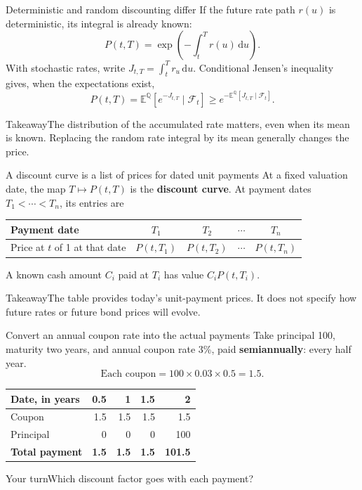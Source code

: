 \documentclass[handout,10pt,t,aspectratio=169]{beamer}
\newenvironment{pausebox}{\begin{block}{Your turn}}{\end{block}}
\newenvironment{keybox}{\begin{exampleblock}{Takeaway}}{\end{exampleblock}}
\newcommand{\E}{\mathbb E}
\newcommand{\Q}{\mathbb Q}
\newcommand{\F}{\mathcal F}
\newcommand{\dd}{\,\mathrm d}
\begin{document}
\begin{frame}{Deterministic and random discounting differ}
If the future rate path \(r(u)\) is deterministic, its integral is already known:
\[
 P(t,T)=\exp\!\left(-\int_t^T r(u)\dd u\right).
\]
With stochastic rates, write \(J_{t,T}=\int_t^T r_u\dd u\).
Conditional Jensen's inequality gives, when the expectations exist,
\[
 \boxed{P(t,T)=\E^\Q[e^{-J_{t,T}}\mid\F_t]
 \geq e^{-\E^\Q[J_{t,T}\mid\F_t]}.}
\]
\begin{keybox}The distribution of the accumulated rate matters, even when
its mean is known. Replacing the random rate integral by its mean generally changes the price.\end{keybox}
\end{frame}

\begin{frame}{A discount curve is a list of prices for dated unit payments}
At a fixed valuation date, the map \(T\mapsto P(t,T)\) is the \textbf{discount curve}.
At payment dates \(T_1<\cdots<T_n\), its entries are
\begin{center}\begin{tabular}{lcccc}
\toprule Payment date & \(T_1\) & \(T_2\) & \(\cdots\) & \(T_n\)\\\midrule
Price at \(t\) of 1 at that date & \(P(t,T_1)\) & \(P(t,T_2)\) & \(\cdots\) & \(P(t,T_n)\)\\\bottomrule
\end{tabular}\end{center}
A known cash amount \(C_i\) paid at \(T_i\) has value \(C_iP(t,T_i)\).
\begin{keybox}The table provides today's unit-payment prices.
It does not specify how future rates or future bond prices will evolve.\end{keybox}
\end{frame}

\begin{frame}{Convert an annual coupon rate into the actual payments}
Take principal 100, maturity two years, and annual coupon rate 3\%,
paid \textbf{semiannually}: every half year.
\[
 \text{Each coupon}=100\times0.03\times0.5=1.5.
\]
\begin{center}\begin{tabular}{lrrrr}
\toprule Date, in years & 0.5 & 1 & 1.5 & 2\\\midrule
Coupon & 1.5 & 1.5 & 1.5 & 1.5\\
Principal & 0 & 0 & 0 & 100\\
\textbf{Total payment} & \textbf{1.5} & \textbf{1.5} & \textbf{1.5} & \textbf{101.5}\\\bottomrule
\end{tabular}\end{center}
\begin{pausebox}Which discount factor goes with each payment?\end{pausebox}
\end{frame}
\end{document}
